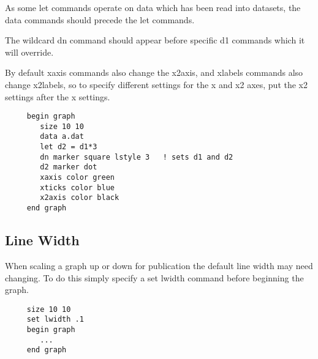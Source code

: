 As some {\sf let} commands operate on data which has been read into datasets,
the {\sf data} commands should precede the {\sf let} commands.

The wildcard {\sf dn} command should appear before
specific {\sf d1} commands which it will override.

By default xaxis commands also change the x2axis, and xlabels commands
also change x2labels, so to specify different settings for
the x and x2 axes, put the x2 settings after the x settings.

\preglecode{}
\begin{Verbatim}
     begin graph
        size 10 10
        data a.dat
        let d2 = d1*3
        dn marker square lstyle 3   ! sets d1 and d2
        d2 marker dot
        xaxis color green
        xticks color blue
        x2axis color black
     end graph
\end{Verbatim}
\postglecode{}

\subsection{Line Width}
When scaling a graph up or down for publication the default
line width may need changing. To do this simply
specify a {\sf set lwidth} command before beginning the graph.

\preglecode{}
\begin{Verbatim}
     size 10 10
     set lwidth .1
     begin graph
        ...
     end graph
\end{Verbatim}
\postglecode{}
